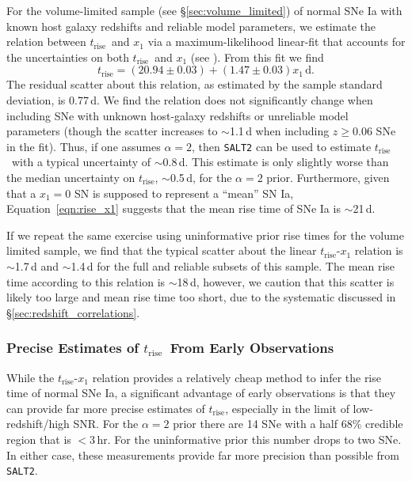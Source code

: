 \documentclass[twocolumn]{./aastex63}
\newcommand{\trise}{$t_\mathrm{rise}$}
\begin{document}
For the volume-limited sample (see \S\ref{sec:volume_limited}) of normal SNe
Ia with known host galaxy redshifts and reliable model parameters, we estimate
the relation between \trise\ and $x_1$ via a maximum-likelihood linear-fit
that accounts for the uncertainties on both \trise\ and $x_1$ (see
\citealt{Hogg10}). From this fit we find
%
\begin{equation}
    t_\mathrm{rise} = (20.94 \pm 0.03) + (1.47 \pm 0.03)x_1\,\mathrm{d}.
    \label{eqn:rise_x1}
\end{equation} 
%
The residual scatter about this relation, as estimated by the sample standard
deviation, is 0.77\,d. We find the relation does not significantly change when
including SNe with unknown host-galaxy redshifts or unreliable model parameters
(though the scatter increases to $\sim$1.1\,d when including $z \ge 0.06$ SNe in
the fit). Thus, if one assumes $\alpha = 2$, then \texttt{SALT2} can be used to
estimate \trise\ with a typical uncertainty of $\sim$0.8\,d. This estimate is
only slightly worse than the median uncertainty on \trise, $\sim$0.5\,d, for the
$\alpha = 2$ prior. Furthermore, given that a $x_1 = 0$ SN is supposed to
represent a ``mean'' SN Ia, Equation~\ref{eqn:rise_x1} suggests that the mean
rise time of SNe Ia is $\sim$21\,d.

If we repeat the same exercise using uninformative prior rise times for the
volume limited sample, we find that the typical scatter about the linear
\trise-$x_1$ relation is $\sim$1.7\,d and $\sim$1.4\,d for the full and reliable
subsets of this sample. The mean rise time according to this relation is
$\sim$18\,d, however, we caution that this scatter is likely too large and mean
rise time too short, due to the systematic discussed in
\S\ref{sec:redshift_correlations}.

\subsubsection{Precise Estimates of \trise\ From Early Observations}

While the \trise-$x_1$ relation provides a relatively cheap method to infer the
rise time of normal SNe Ia, a significant advantage of early observations is
that they can provide far more precise estimates of \trise, especially in the
limit of low-redshift/high SNR. For the $\alpha = 2$ prior there are 14 SNe with
a half 68\% credible region that is $< 3$\,hr. For the uninformative prior this
number drops to two SNe. In either case, these measurements provide far more
precision than possible from \texttt{SALT2}.
\end{document}
